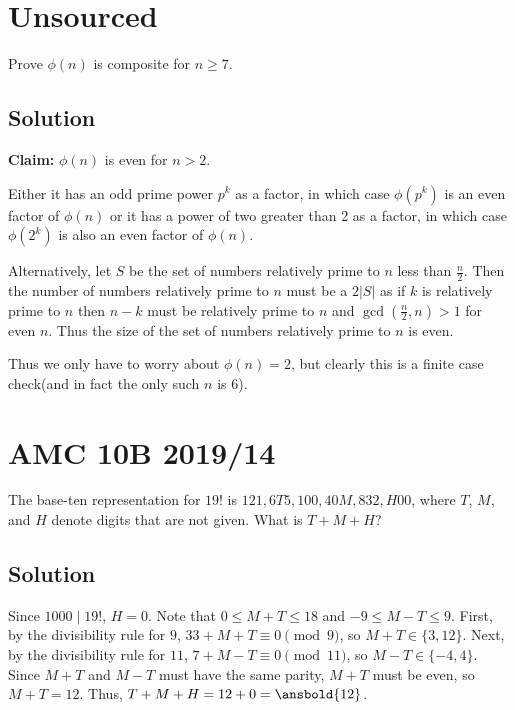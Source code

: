 \documentclass[mast]{lucky}
\begin{document}
\pagebreak\section{Unsourced}

Prove $\phi(n)$ is composite for $n\geq 7.$

\subsection{Solution}

\textbf{Claim:} $\phi(n)$ is even for $n > 2$.
\begin{pro}[1 (Direct)]
Either it has an odd prime power $p^k$ as a factor, in which case $\phi(p^k)$ is an even factor of $\phi(n)$ or it has a power of two greater than 2 as a factor, in which case $\phi(2^k)$ is also an even factor of $\phi(n)$. 
\end{pro}
\begin{pro}[2 (Combinitorial)]
Alternatively, let $S$ be the set of numbers relatively prime to $n$ less than $\frac{n}2$. Then the number of numbers relatively prime to $n$ must be a $2|S|$ as if $k$ is relatively prime to $n$ then $n-k$ must be relatively prime to $n$ and $\gcd\left(\frac{n}{2}, n\right) > 1$ for even $n$. Thus the size of the set of numbers relatively prime to $n$ is even.
\end{pro}
Thus we only have to worry about $\phi(n) = 2$, but clearly this is a finite case check(and in fact the only such $n$ is $6$).
\pagebreak\section{AMC 10B 2019/14}

The base-ten representation for $19!$ is $121,6T5,100,40M,832,H00$, where $T$, $M$, and $H$ denote digits that are not given. What is $T+M+H$?

\subsection{Solution}

Since $1000 \mid 19!$, $H = 0$. Note that $0 \leq M + T \leq 18$ and $-9 \leq M - T \leq 9$. First, by the divisibility rule for $9$, $33 + M + T  \equiv 0 \pmod 9$, so $M + T \in \{3, 12\}$. Next, by the divisibility rule for $11$, $7 + M - T \equiv 0 \pmod{11}$, so $M - T \in \{-4, 4\}$. Since $M + T$ and $M - T$ must have the same parity, $M + T$ must be even, so $M + T = 12$. Thus, $T + M + H = 12 + 0 = \ansbold{12}$.
\end{document}
